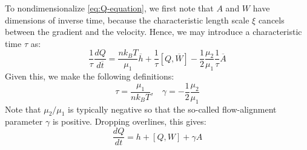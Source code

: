 \documentclass[reqno]{article}
\begin{document}
  To nondimensionalize \eqref{eq:Q-equation}, we first note that $A$ and $W$
  have dimensions of inverse time, because the characteristic length scale $\xi$
  cancels between the gradient and the velocity.
  Hence, we may introduce a characteristic time $\tau$ as:
  \begin{equation}
    \frac{1}{\tau} \frac{dQ}{d\overline{t}}
    =
    \frac{n k_B T}{\mu_1} \overline{h}
    + \frac{1}{\tau} [Q, \overline{W}]
    - \frac12 \frac{\mu_2}{\mu_1} \frac{1}{\tau} \overline{A}
  \end{equation}
  Given this, we make the following definitions:
  \begin{equation}
    \tau = \frac{\mu_1}{n k_B T}, \:\:\:\:
    \gamma = -\frac12 \frac{\mu_2}{\mu_1}
  \end{equation}
  Note that $\mu_2/\mu_1$ is typically negative so that the so-called
  flow-alignment parameter $\gamma$ is positive.
  Dropping overlines, this gives:
  \begin{equation}
    \frac{dQ}{dt}
    =
    h + [Q, W] + \gamma A
  \end{equation}
\end{document}
